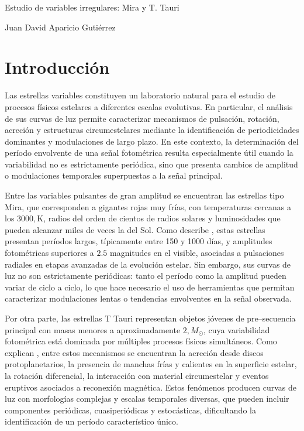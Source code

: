 \documentclass[letterpaper,12pt]{extarticle}
\begin{document}
\begin{center}

    \Large Estudio de variables irregulares: Mira y T. Tauri
    
    \vspace{3mm}

    \large Juan David Aparicio Gutiérrez

    \vspace{3mm}
    \normalsize 
\end{center}


\section{Introducción}

Las estrellas variables constituyen un laboratorio natural para el estudio de procesos físicos estelares a diferentes escalas evolutivas. En particular, el análisis de sus curvas de luz permite caracterizar mecanismos de pulsación, rotación, acreción y estructuras circumestelares mediante la identificación de periodicidades dominantes y modulaciones de largo plazo. En este contexto, la determinación del período envolvente de una señal fotométrica resulta especialmente útil cuando la variabilidad no es estrictamente periódica, sino que presenta cambios de amplitud o modulaciones temporales superpuestas a la señal principal.

Entre las variables pulsantes de gran amplitud se encuentran las estrellas tipo Mira, que corresponden a gigantes rojas muy frías, con temperaturas cercanas a los $3000,\mathrm{K}$, radios del orden de cientos de radios solares y luminosidades que pueden alcanzar miles de veces la del Sol. Como describe \cite{mattei1997}, estas estrellas presentan períodos largos, típicamente entre 150 y 1000 días, y amplitudes fotométricas superiores a $2.5$ magnitudes en el visible, asociadas a pulsaciones radiales en etapas avanzadas de la evolución estelar. Sin embargo, sus curvas de luz no son estrictamente periódicas: tanto el período como la amplitud pueden variar de ciclo a ciclo, lo que hace necesario el uso de herramientas que permitan caracterizar modulaciones lentas o tendencias envolventes en la señal observada.

Por otra parte, las estrellas T Tauri representan objetos jóvenes de pre–secuencia principal con masas menores a aproximadamente $2,M_\odot$, cuya variabilidad fotométrica está dominada por múltiples procesos físicos simultáneos. Como explican \cite{elizabethson2023}, entre estos mecanismos se encuentran la acreción desde discos protoplanetarios, la presencia de manchas frías y calientes en la superficie estelar, la rotación diferencial, la interacción con material circumestelar y eventos eruptivos asociados a reconexión magnética. Estos fenómenos producen curvas de luz con morfologías complejas y escalas temporales diversas, que pueden incluir componentes periódicas, cuasiperiódicas y estocásticas, dificultando la identificación de un período característico único.
\end{document}

